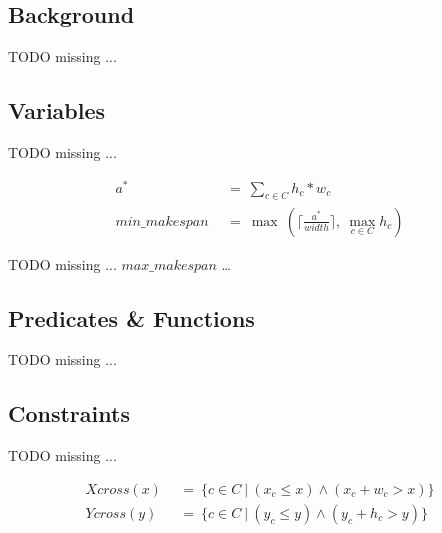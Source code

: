 
\subsection{Background}
    \colorbox{BurntOrange}{TODO missing ...}


\subsection{Variables}
    \colorbox{BurntOrange}{TODO missing ...}

    \begin{align*}
                  a^*\ &\ =\ \sum_{c \in C} h_c * w_c \\
        min\_makespan\ &\ =\ \max\ (\lceil \frac{a^*}{width} \rceil,\ \max_{c \in C} h_c)
    \end{align*}

    \colorbox{BurntOrange}{TODO missing ...}
    \(max\_makespan\) \ldots
    


\subsection{Predicates \& Functions}
    \colorbox{BurntOrange}{TODO missing ...}



\subsection{Constraints}
    \colorbox{BurntOrange}{TODO missing ...}

    \begin{align*}
        Xcross(x)\ &\ =\ \{ c \in C\ |\ (x_c \leq x) \land (x_c + w_c > x) \} \\
        Ycross(y)\ &\ =\ \{ c \in C\ |\ (y_c \leq y) \land (y_c + h_c > y) \} 
    \end{align*}

